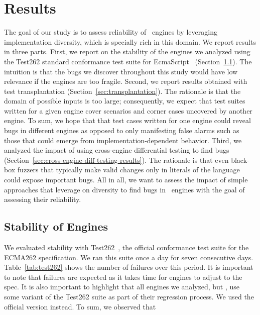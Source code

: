 \documentclass[10pt,conference,anonymous]{IEEEtran}
\begin{document}
\section{Results}
\label{sec:results}

The goal of our study is to assess reliability of \js\ engines by
leveraging implementation diversity, which is specially rich in this
domain. We report results in three parts. First, we report on the
stability of the engines we analyzed using the Test262 standard
conformance test suite for EcmaScript~\cite{ecma262-conformance-suite}
(Section~\ref{sec:stability}). The intuition is that the bugs we
discover throughout this study would have low relevance if the engines
are too fragile. Second, we report results obtained with test
transplantation (Section~\ref{sec:transplantation}). The rationale is
that the domain of possible inputs is too large; consequently, we
expect that test suites written for a given engine cover scenarios and
corner cases uncovered by another engine. To sum, we hope that that
test cases written for one engine could reveal bugs in different
engines as opposed to only manifesting false alarms such as those that
could emerge from implementation-dependent behavior. Third, we
analyzed the impact of using cross-engine differential testing to find
bugs (Section~\ref{sec:cross-engine-diff-testing-results}). The
rationale is that even black-box fuzzers that typically make valid
changes only in literals of the language could expose important
bugs. All in all, we want to assess the impact of simple approaches
that leverage on diversity to find bugs in \js\ engines with the goal
of assessing their reliability.

\subsection{Stability of Engines}
\label{sec:stability}

We evaluated stability with Test262~\cite{ecma262-conformance-suite},
the official \js{} conformance test suite for the ECMA262
specification. We ran this suite once a day for seven consecutive
days. Table~\ref{tab:test262} shows the number of failures over this
period. It is important to note that failures are expected as it takes
time for engines to adjust to the spec. It is also important to
highlight that all engines we analyzed, but \chakra{}, use some
variant of the Test262 suite as part of their regression
process. We used the official version
instead. To sum, we observed
that  
\end{document}
